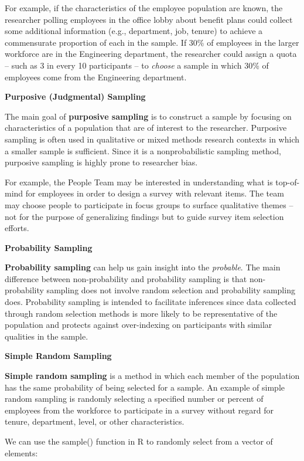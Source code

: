 \documentclass[
]{book}
\begin{document}
For example, if the characteristics of the employee population are known, the researcher polling employees in the office lobby about benefit plans could collect some additional information (e.g., department, job, tenure) to achieve a commensurate proportion of each in the sample. If 30\% of employees in the larger workforce are in the Engineering department, the researcher could assign a quota -- such as 3 in every 10 participants -- to \emph{choose} a sample in which 30\% of employees come from the Engineering department.

\textbf{Purposive (Judgmental) Sampling}

The main goal of \textbf{purposive sampling} is to construct a sample by focusing on characteristics of a population that are of interest to the researcher. Purposive sampling is often used in qualitative or mixed methods research contexts in which a smaller sample is sufficient. Since it is a nonprobabilistic sampling method, purposive sampling is highly prone to researcher bias.

For example, the People Team may be interested in understanding what is top-of-mind for employees in order to design a survey with relevant items. The team may choose people to participate in focus groups to surface qualitative themes -- not for the purpose of generalizing findings but to guide survey item selection efforts.

\textbf{Probability Sampling}

\textbf{Probability sampling} can help us gain insight into the \emph{probable}. The main difference between non-probability and probability sampling is that non-probability sampling does not involve random selection and probability sampling does. Probability sampling is intended to facilitate inferences since data collected through random selection methods is more likely to be representative of the population and protects against over-indexing on participants with similar qualities in the sample.

\textbf{Simple Random Sampling}

\textbf{Simple random sampling} is a method in which each member of the population has the same probability of being selected for a sample. An example of simple random sampling is randomly selecting a specified number or percent of employees from the workforce to participate in a survey without regard for tenure, department, level, or other characteristics.

We can use the sample() function in R to randomly select from a vector of elements:
\end{document}
